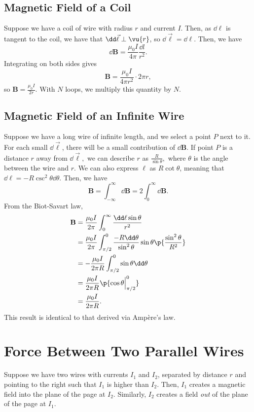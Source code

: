 \documentclass[11pt]{article}
\begin{document}
\subsection{Magnetic Field of a Coil}
Suppose we have a coil of wire with radius $r$ and current $I$. Then, as $\dd \ell$ is tangent to the coil, we have that $\dd \vec{\ell} \perp \vu{r}$, so $\dd \vec{\ell} = \dd \ell$. Then, we have
\[\dd \mathbf{B} = \frac{\mu_0I}{4\pi} \frac{\dd l}{r^2}.\]
Integrating on both sides gives
\[\mathbf{B} = \frac{\mu_0I}{4\pi r^2} \cdot 2\pi r,\]
so $\mathbf{B} = \frac{\mu_0I}{2r}$. With $N$ loops, we multiply this quantity by $N$.
\subsection{Magnetic Field of an Infinite Wire}
Suppose we have a long wire of infinite length, and we select a point $P$ next to it. For each small $\dd \vec{\ell}$, there will be a small contribution of $\dd \mathbf{B}$. If point $P$ is a distance $r$ away from $\dd \vec{\ell},$ we can describe $r$ as $\frac{R}{\sin\theta},$ where $\theta$ is the angle between the wire and $r$. We can also express $\ell$ as $R\cot\theta$, meaning that $\dd \ell = -R\csc^2\theta\dd\theta$. Then, we have
\[\mathbf{B} = \int_{-\infty}^{\infty} \dd \mathbf{B} = 2\int_0^{\infty} \dd \mathbf{B}.\]
From the Biot-Savart law,
\begin{align*}
    \mathbf{B} &= \frac{\mu_0 I}{2\pi} \int_{0}^{\infty} \frac{\dd\ell\sin\theta}{r^2} \\
    &= \frac{\mu_0 I}{2\pi} \int_{\pi/2}^{0} \frac{-R\dd\theta}{\sin^2\theta} \sin\theta \p{\frac{\sin^2\theta}{R^2}} \\
    &= -\frac{\mu_0 I}{2\pi R}\int_{\pi/2}^{0} \sin\theta\dd \theta \\
    &= \frac{\mu_0I}{2\pi R}\p{\cos \theta\Big|_{\pi/2}^0} \\
    &= \frac{\mu_0 I}{2\pi R}.
\end{align*}
This result is identical to that derived via Amp\` ere's law.

\section{Force Between Two Parallel Wires}
Suppose we have two wires with currents $I_1$ and $I_2$, separated by distance $r$ and pointing to the right such that $I_1$ is higher than $I_2$. Then, $I_1$ creates a magnetic field into the plane of the page at $I_2$. Similarly, $I_2$ creates a field \textit{out} of the plane of the page at $I_1$.
\end{document}

